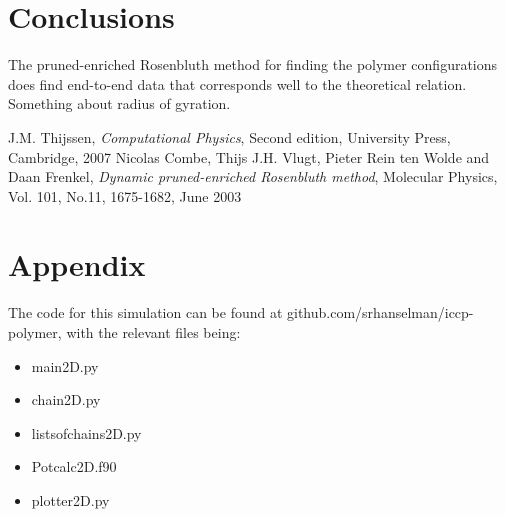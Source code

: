 \documentclass{article}
\begin{document}
\begin{multicols}{2}
\section*{Conclusions}
The pruned-enriched Rosenbluth method  for finding the polymer configurations does find end-to-end data that corresponds well to the theoretical relation. {\color{blue}Something about radius of gyration.}
\begin{thebibliography}{9}
 J.M. Thijssen,\emph{ Computational Physics}, Second edition, University Press, Cambridge, 2007
 Nicolas Combe, Thijs J.H. Vlugt, Pieter Rein ten Wolde and Daan Frenkel, \emph{Dynamic pruned-enriched Rosenbluth method}, Molecular Physics, Vol. 101, No.11, 1675-1682, June 2003
\end{thebibliography}

\section*{Appendix}
The code for this simulation can be found at github.com/srhanselman/iccp-polymer, with the relevant files being:
\begin{itemize}
\item main2D.py
\item chain2D.py
\item listsofchains2D.py 
\item Potcalc2D.f90
\item plotter2D.py
\end{itemize}
\end{multicols}
\end{document}
